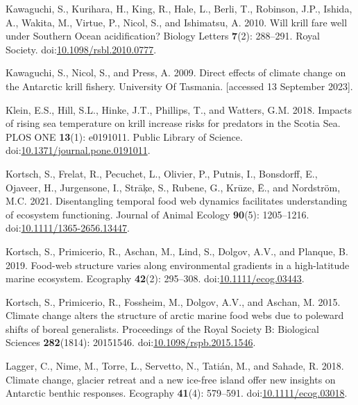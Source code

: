 \documentclass[
]{article}
\newlength{\cslhangindent}
\newenvironment{CSLReferences}[2] %
 {\begin{list}{}{%
  \setlength{\itemindent}{0pt}
  \setlength{\leftmargin}{0pt}
  \setlength{\parsep}{0pt}
  \ifodd #1
   \setlength{\leftmargin}{\cslhangindent}
   \setlength{\itemindent}{-1\cslhangindent}
  \fi
  \setlength{\itemsep}{#2\baselineskip}}}
 {\end{list}}
\begin{document}
\begin{CSLReferences}{1}{0}
Kawaguchi, S., Kurihara, H., King, R., Hale, L., Berli, T., Robinson,
J.P., Ishida, A., Wakita, M., Virtue, P., Nicol, S., and Ishimatsu, A.
2010. Will krill fare well under {Southern Ocean} acidification? Biology
Letters \textbf{7}(2): 288--291. Royal Society.
doi:\href{https://doi.org/10.1098/rsbl.2010.0777}{10.1098/rsbl.2010.0777}.

Kawaguchi, S., Nicol, S., and Press, A. 2009. Direct effects of climate
change on the {Antarctic} krill fishery. University Of Tasmania.
{[}accessed 13 September 2023{]}.

Klein, E.S., Hill, S.L., Hinke, J.T., Phillips, T., and Watters, G.M.
2018. Impacts of rising sea temperature on krill increase risks for
predators in the {Scotia Sea}. PLOS ONE \textbf{13}(1): e0191011. Public
Library of Science.
doi:\href{https://doi.org/10.1371/journal.pone.0191011}{10.1371/journal.pone.0191011}.

Kortsch, S., Frelat, R., Pecuchet, L., Olivier, P., Putnis, I.,
Bonsdorff, E., Ojaveer, H., Jurgensone, I., Strāķe, S., Rubene, G.,
Krūze, Ē., and Nordström, M.C. 2021. Disentangling temporal food web
dynamics facilitates understanding of ecosystem functioning. Journal of
Animal Ecology \textbf{90}(5): 1205--1216.
doi:\href{https://doi.org/10.1111/1365-2656.13447}{10.1111/1365-2656.13447}.

Kortsch, S., Primicerio, R., Aschan, M., Lind, S., Dolgov, A.V., and
Planque, B. 2019. Food-web structure varies along environmental
gradients in a high-latitude marine ecosystem. Ecography \textbf{42}(2):
295--308.
doi:\href{https://doi.org/10.1111/ecog.03443}{10.1111/ecog.03443}.

Kortsch, S., Primicerio, R., Fossheim, M., Dolgov, A.V., and Aschan, M.
2015. Climate change alters the structure of arctic marine food webs due
to poleward shifts of boreal generalists. Proceedings of the Royal
Society B: Biological Sciences \textbf{282}(1814): 20151546.
doi:\href{https://doi.org/10.1098/rspb.2015.1546}{10.1098/rspb.2015.1546}.

Lagger, C., Nime, M., Torre, L., Servetto, N., Tatián, M., and Sahade,
R. 2018. Climate change, glacier retreat and a new ice-free island offer
new insights on {Antarctic} benthic responses. Ecography \textbf{41}(4):
579--591.
doi:\href{https://doi.org/10.1111/ecog.03018}{10.1111/ecog.03018}.


\end{CSLReferences}
\end{document}
